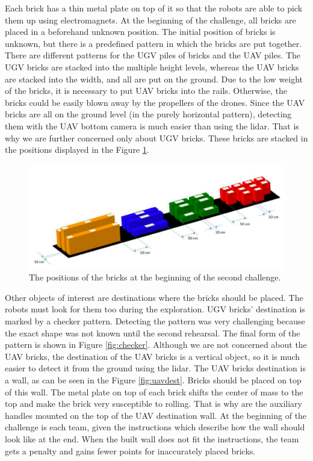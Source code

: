 Each brick has a thin metal plate on top of it so that the robots are able to pick them up using electromagnets. At the beginning of the challenge, all bricks are placed in a beforehand unknown position. The initial position of bricks is unknown, but there is a predefined pattern in which the bricks are put together. There are different patterns for the UGV piles of bricks and the UAV piles. The UGV bricks are stacked into the multiple height levels, whereas the UAV bricks are stacked into the width, and all are put on the ground. Due to the low weight of the bricks, it is necessary to put UAV bricks into the rails. Otherwise, the bricks could be easily blown away by the propellers of the drones. Since the UAV bricks are all on the ground level (in the purely horizontal pattern), detecting them with the UAV bottom camera is much easier than using the lidar. That is why we are further concerned only about UGV bricks. These bricks are stacked in the positions displayed in the Figure \ref{fig:piledef}.

\begin{figure}[H]

\centering
\includegraphics[scale=0.35]{fig/initial_layout.png}
\caption[Initial brick layout]{The positions of the bricks at the beginning of the second challenge.}
\label{fig:piledef}

\end{figure}

Other objects of interest are destinations where the bricks should be placed. The robots must look for them too during the exploration. UGV bricks' destination is marked by a checker pattern. Detecting the pattern was very challenging because the exact shape was not known until the second rehearsal. The final form of the pattern is shown in Figure \ref{fig:checker}. Although we are not concerned about the UAV bricks, the destination of the UAV bricks is a vertical object, so it is much easier to detect it from the ground using the lidar. The UAV bricks destination is a wall, as can be seen in the Figure \ref{fig:uavdest}. Bricks should be placed on top of this wall. The metal plate on top of each brick shifts the center of mass to the top and make the brick very susceptible to rolling. That is why are the auxiliary handles mounted on the top of the UAV destination wall. At the beginning of the challenge is each team, given the instructions which describe how the wall should look like at the end. When the built wall does not fit the instructions, the team gets a penalty and gains fewer points for inaccurately placed bricks.


